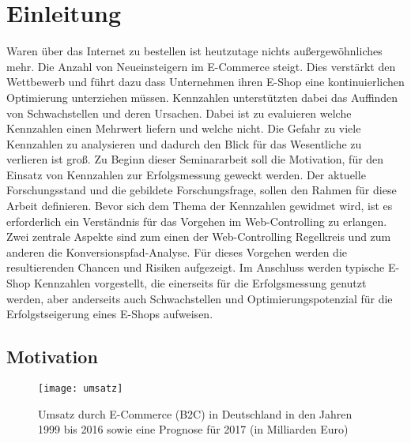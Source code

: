 \section{Einleitung}
Waren über das Internet zu bestellen ist heutzutage nichts außergewöhnliches mehr. Die Anzahl von Neueinsteigern im E-Commerce steigt. Dies verstärkt den Wettbewerb und führt dazu dass Unternehmen ihren E-Shop eine kontinuierlichen Optimierung unterziehen müssen. Kennzahlen unterstützten dabei das Auffinden von Schwachstellen und deren Ursachen. Dabei ist zu evaluieren welche Kennzahlen einen Mehrwert liefern und welche nicht. Die Gefahr zu viele Kennzahlen zu analysieren und dadurch den Blick für das Wesentliche zu verlieren ist groß.
Zu Beginn dieser Seminararbeit soll die Motivation, für den Einsatz von Kennzahlen zur Erfolgsmessung geweckt werden. Der aktuelle Forschungsstand und die gebildete Forschungsfrage, sollen den Rahmen für diese Arbeit definieren. Bevor sich dem Thema der Kennzahlen gewidmet wird, ist es erforderlich ein Verständnis für das Vorgehen im Web-Controlling zu erlangen. Zwei zentrale Aspekte sind zum einen der Web-Controlling Regelkreis und zum anderen die Konversionspfad-Analyse. Für dieses Vorgehen werden die resultierenden Chancen und Risiken aufgezeigt. Im Anschluss werden typische E-Shop Kennzahlen vorgestellt, die einerseits für die Erfolgsmessung genutzt werden, aber anderseits auch Schwachstellen und Optimierungspotenzial für die Erfolgstseigerung eines E-Shops aufweisen.

\subsection{Motivation}

\begin{figure}[H]
	\begin{center}
		\texttt{[image: umsatz]}
		\caption{Umsatz durch E-Commerce (B2C) in Deutschland in den Jahren 1999 bis 2016 sowie eine Prognose für 2017 (in Milliarden Euro)}
	\end{center}
\end{figure}

